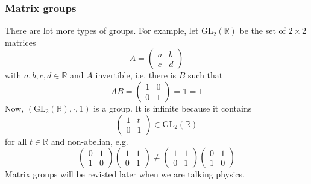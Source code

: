 \documentclass[10pt, a4paper, twoside]{report}
\begin{document}
\subsubsection{Matrix groups}
There are lot more types of groups. For example, let \(\mathrm{GL}_2(\mathbb{R})\) be the set of \(2\times 2\) matrices 
\[A=\begin{pmatrix}
    a & b \\ c & d
\end{pmatrix}\]
with \(a,b,c,d\in\mathbb{R}\) and \(A\) invertible, i.e. there is \(B\) such that 
\[AB=\begin{pmatrix}
    1 & 0 \\ 0 & 1
\end{pmatrix}=\mathbb{1}=1\]
Now, \((\mathrm{GL}_2(\mathbb{R}),\cdot,1)\) is a group. It is infinite because it contains 
\[\begin{pmatrix}
    1 & t \\ 0 & 1
\end{pmatrix}\in\mathrm{GL}_2(\mathbb{R})\]
for all \(t\in\mathbb{R}\) and non-abelian, e.g. 
\[\begin{pmatrix}
    0 & 1 \\ 1 & 0
\end{pmatrix}\begin{pmatrix}
    1 & 1 \\ 0 & 1
\end{pmatrix}\neq\begin{pmatrix}
    1 & 1 \\ 0 & 1
\end{pmatrix}\begin{pmatrix}
    0 & 1 \\ 1 & 0
\end{pmatrix}\]
Matrix groups will be revisted later when we are talking physics.
\end{document}
